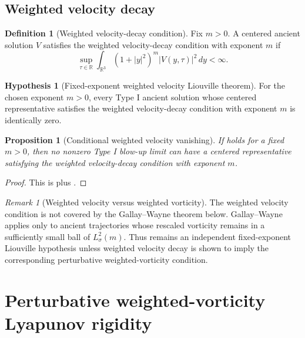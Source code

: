 \documentclass[11pt]{amsart}
\theoremstyle{plain}
\newtheorem{proposition}[theorem]{Proposition}
\theoremstyle{definition}
\newtheorem{definition}[theorem]{Definition}
\newtheorem{hypothesis}[theorem]{Hypothesis}
\theoremstyle{remark}
\newtheorem{remark}[theorem]{Remark}
\numberwithin{equation}{section}
\begin{document}
\subsection{Weighted velocity decay}

\begin{definition}[Weighted velocity-decay condition]
\label{def:weighted-velocity-condition}
Fix \(m>0\).  A centered ancient solution \(V\) satisfies the weighted
velocity-decay condition with exponent \(m\) if
\[
   \sup_{\tau\in\mathbb R}
   \int_{\mathbb R^3}(1+|y|^2)^m |V(y,\tau)|^2\,dy<\infty .
\]
\end{definition}

\begin{hypothesis}[Fixed-exponent weighted velocity Liouville theorem]
\label{hyp:weighted-velocity-liouville}
For the chosen exponent \(m>0\), every Type I ancient solution whose centered
representative satisfies the weighted velocity-decay condition with
exponent \(m\) is identically zero.
\end{hypothesis}

\begin{proposition}[Conditional weighted velocity vanishing]
\label{prop:weighted-velocity-conditional}
If  holds for a fixed \(m>0\), then no
nonzero Type I blow-up limit can have a centered representative
satisfying the weighted velocity-decay condition with exponent \(m\).
\end{proposition}

\begin{proof}
This is  plus
.
\end{proof}

\begin{remark}[Weighted velocity versus weighted vorticity]
The weighted velocity condition is not covered by the Gallay--Wayne
theorem below.  Gallay--Wayne applies only to ancient trajectories whose
rescaled vorticity remains in a sufficiently small ball of \(L^2_\sigma(m)\).
Thus  remains an independent
fixed-exponent Liouville hypothesis unless weighted velocity decay is shown to
imply the corresponding perturbative weighted-vorticity condition.
\end{remark}

\section{Perturbative weighted-vorticity Lyapunov rigidity}
\label{sec:weighted-vorticity}
\end{document}
